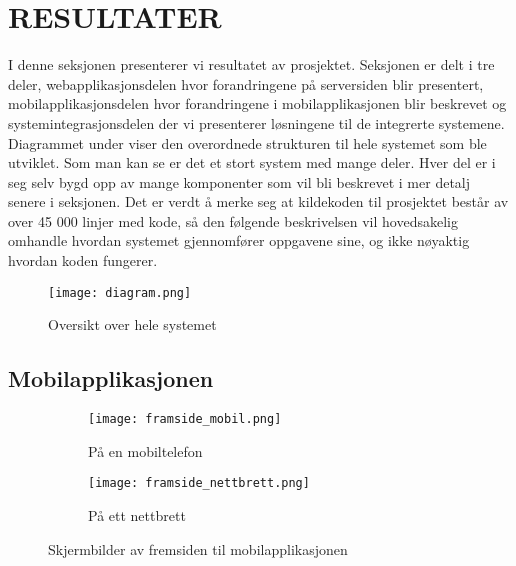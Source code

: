 \documentclass[../main.tex]{subfiles}
\begin{document}
\chapter{RESULTATER}

I denne seksjonen presenterer vi resultatet av prosjektet. Seksjonen er delt i tre deler, webapplikasjonsdelen hvor forandringene på serversiden blir presentert, mobilapplikasjonsdelen hvor forandringene i mobilapplikasjonen blir beskrevet og systemintegrasjonsdelen der vi presenterer løsningene til de integrerte systemene.\newline
\newline
Diagrammet under viser den overordnede strukturen til hele systemet som ble utviklet. Som man kan se er det et stort system med mange deler. Hver del er i seg selv bygd opp av mange komponenter som vil bli beskrevet i mer detalj senere i seksjonen. Det er verdt å merke seg at kildekoden til prosjektet består av over 45 000 linjer med kode, så den følgende beskrivelsen vil hovedsakelig omhandle hvordan systemet gjennomfører oppgavene sine, og ikke nøyaktig hvordan koden fungerer.

\begin{figure}[H]
  \centering
  \texttt{[image: diagram.png]}
  \caption{Oversikt over hele systemet}
\end{figure}

\section{Mobilapplikasjonen}

\begin{figure}[H]
        \centering
        \begin{subfigure}[b]{0.3\textwidth}
                \centering
                \texttt{[image: framside\_mobil.png]}
                \caption{På en mobiltelefon}
        \end{subfigure}
        \quad
        \begin{subfigure}[b]{0.3\textwidth}
                \centering
                \texttt{[image: framside\_nettbrett.png]}
                \caption{På ett nettbrett}
        \end{subfigure}
        \caption{Skjermbilder av fremsiden til mobilapplikasjonen}
\end{figure}
\end{document}
